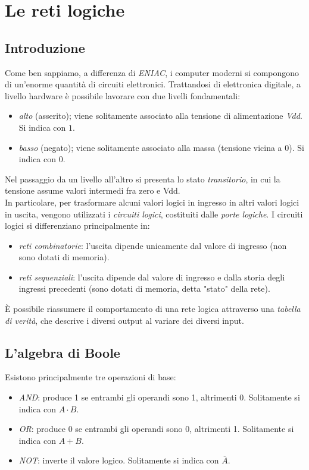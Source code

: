 \documentclass[class=book, crop=false, oneside]{standalone}
\begin{document}
\chapter{Le reti logiche}
\section{Introduzione}
Come ben sappiamo, a differenza di \emph{ENIAC}, i computer moderni si compongono di un'enorme quantità di circuiti elettronici. Trattandosi di elettronica digitale, a livello hardware è possibile lavorare con due livelli fondamentali:
\begin{itemize}
	\item \emph{alto} (asserito); viene solitamente associato alla tensione di alimentazione \emph{Vdd}. Si indica con \(1\).
	\item \emph{basso} (negato); viene solitamente associato alla massa (tensione vicina a 0). Si indica con \(0\).
\end{itemize}
Nel passaggio da un livello all'altro si presenta lo stato \emph{transitorio}, in cui la tensione assume valori intermedi fra zero e Vdd.\\
In particolare, per trasformare alcuni valori logici in ingresso in altri valori logici in uscita, vengono utilizzati i \emph{circuiti logici}, costituiti dalle \emph{porte logiche}. I circuiti logici si differenziano principalmente in:
\begin{itemize}
	\item \emph{reti combinatorie}: l'uscita dipende unicamente dal valore di ingresso (non sono dotati di memoria).
	\item \emph{reti sequenziali}: l'uscita dipende dal valore di ingresso e dalla storia degli ingressi precedenti (sono dotati di memoria, detta "stato" della rete).
\end{itemize}
\`{E} possibile riassumere il comportamento di una rete logica attraverso una \emph{tabella di verità}, che descrive i diversi output al variare dei diversi input.

\section{L'algebra di Boole}
Esistono principalmente tre operazioni di base:
\begin{itemize}
	\item \emph{AND}: produce 1 se entrambi gli operandi sono 1, altrimenti 0. Solitamente si indica con \(A\cdot B\).
	\item \emph{OR}: produce 0 se entrambi gli operandi sono 0, altrimenti 1. Solitamente si indica con \(A+B\).
	\item \emph{NOT}: inverte il valore logico. Solitamente si indica con \(\overline{A}\).
\end{itemize}
\end{document}
